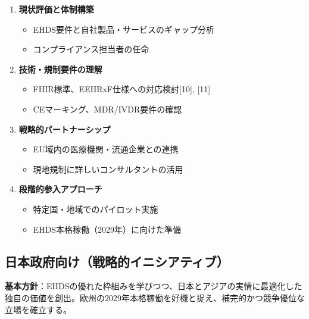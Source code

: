 \documentclass[
  a4paper,
  a4paper,
  11pt]{ltjsbook}
\providecommand{\tightlist}{%
  \setlength{\itemsep}{0pt}\setlength{\parskip}{0pt}}
\begin{document}
\begin{enumerate}
\def\labelenumi{\arabic{enumi}.}
\tightlist
\item
  \textbf{現状評価と体制構築}

  \begin{itemize}
  \tightlist
  \item
    EHDS要件と自社製品・サービスのギャップ分析
  \item
    コンプライアンス担当者の任命
  \end{itemize}
\item
  \textbf{技術・規制要件の理解}

  \begin{itemize}
  \tightlist
  \item
    FHIR標準、EEHRxF仕様への対応検討{[}10{]}, {[}11{]}
  \item
    CEマーキング、MDR/IVDR要件の確認
  \end{itemize}
\item
  \textbf{戦略的パートナーシップ}

  \begin{itemize}
  \tightlist
  \item
    EU域内の医療機関・流通企業との連携
  \item
    現地規制に詳しいコンサルタントの活用
  \end{itemize}
\item
  \textbf{段階的参入アプローチ}

  \begin{itemize}
  \tightlist
  \item
    特定国・地域でのパイロット実施
  \item
    EHDS本格稼働（2029年）に向けた準備
  \end{itemize}
\end{enumerate}

\subsection{日本政府向け（戦略的イニシアティブ）}\label{ux65e5ux672cux653fux5e9cux5411ux3051ux6226ux7565ux7684ux30a4ux30cbux30b7ux30a2ux30c6ux30a3ux30d6}

\begin{tcolorbox}[enhanced jigsaw, toprule=.15mm, bottomtitle=1mm, coltitle=black, left=2mm, opacityback=0, arc=.35mm, colbacktitle=quarto-callout-note-color!10!white, colback=white, opacitybacktitle=0.6, bottomrule=.15mm, rightrule=.15mm, breakable, title=\textcolor{quarto-callout-note-color}{\faInfo}\hspace{0.5em}{Note}, toptitle=1mm, titlerule=0mm, colframe=quarto-callout-note-color-frame, leftrule=.75mm]

\textbf{基本方針}：EHDSの優れた枠組みを学びつつ、日本とアジアの実情に最適化した独自の価値を創出。欧州の2029年本格稼働を好機と捉え、補完的かつ競争優位な立場を確立する。

\end{tcolorbox}
\end{document}
